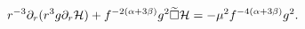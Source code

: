 \begin{equation}
r^{-3}\partial_r(r^3g\partial_r {\cal H})+
f^{-2(\alpha+3\beta)}g^2\widetilde{\square}{\cal H}
=-\mu^2f^{-4(\alpha+3\beta)}g^2.
\label{eq:harme}
\end{equation}


